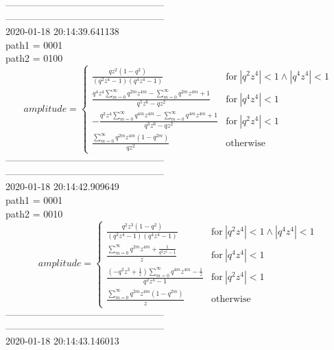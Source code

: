 \documentclass{jsreport}
\begin{document}
--------------------------------------------------\\
--------------------------------------------------\\
2020-01-18 20:14:39.641138\\
path1 = 0001\\
path2 = 0100\\
$$amplitude = \begin{cases} \frac{q z^{2} \left(1 - q^{2}\right)}{\left(q^{2} z^{4} - 1\right) \left(q^{4} z^{4} - 1\right)} & \text{for}\: \left|{q^{2} z^{4}}\right| < 1 \wedge \left|{q^{4} z^{4}}\right| < 1 \\\frac{q^{4} z^{4} \sum_{m=0}^{\infty} q^{2 m} z^{4 m} - \sum_{m=0}^{\infty} q^{2 m} z^{4 m} + 1}{q^{5} z^{6} - q z^{2}} & \text{for}\: \left|{q^{4} z^{4}}\right| < 1 \\- \frac{q^{2} z^{4} \sum_{m=0}^{\infty} q^{4 m} z^{4 m} - \sum_{m=0}^{\infty} q^{4 m} z^{4 m} + 1}{q^{3} z^{6} - q z^{2}} & \text{for}\: \left|{q^{2} z^{4}}\right| < 1 \\\frac{\sum_{m=0}^{\infty} q^{2 m} z^{4 m} \left(1 - q^{2 m}\right)}{q z^{2}} & \text{otherwise} \end{cases}$$
--------------------------------------------------\\
--------------------------------------------------\\
2020-01-18 20:14:42.909649\\
path1 = 0001\\
path2 = 0010\\
$$amplitude = \begin{cases} \frac{q^{2} z^{3} \left(1 - q^{2}\right)}{\left(q^{2} z^{4} - 1\right) \left(q^{4} z^{4} - 1\right)} & \text{for}\: \left|{q^{2} z^{4}}\right| < 1 \wedge \left|{q^{4} z^{4}}\right| < 1 \\\frac{\sum_{m=0}^{\infty} q^{2 m} z^{4 m} + \frac{1}{q^{4} z^{4} - 1}}{z} & \text{for}\: \left|{q^{4} z^{4}}\right| < 1 \\\frac{\left(- q^{2} z^{3} + \frac{1}{z}\right) \sum_{m=0}^{\infty} q^{4 m} z^{4 m} - \frac{1}{z}}{q^{2} z^{4} - 1} & \text{for}\: \left|{q^{2} z^{4}}\right| < 1 \\\frac{\sum_{m=0}^{\infty} q^{2 m} z^{4 m} \left(1 - q^{2 m}\right)}{z} & \text{otherwise} \end{cases}$$
--------------------------------------------------\\
--------------------------------------------------\\
2020-01-18 20:14:43.146013\\
\end{document}
